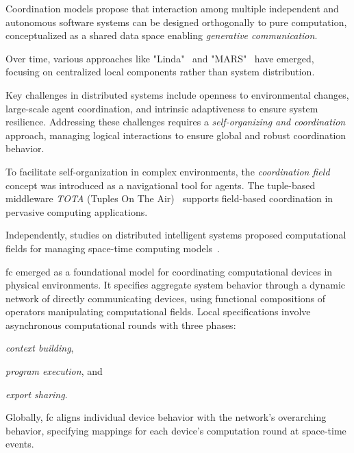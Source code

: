 \documentclass[12pt, a4paper]{article}
\newenvironment{inlinelist}{\begin{enumerate*}[label=\emph{(\roman*)}]}{\end{enumerate*}}
\begin{document}
Coordination models propose that interaction among multiple independent and autonomous software systems can be designed
orthogonally to pure computation, conceptualized as a shared data space enabling \emph{generative communication}.

Over time, various approaches like "Linda"~\cite{ViroliCoordination2012} and "MARS"~\cite{mars} have emerged,
focusing on centralized local components rather than system distribution.

Key challenges in distributed systems include openness to environmental changes, large-scale agent coordination,
and intrinsic adaptiveness to ensure system resilience.
%
Addressing these challenges requires a \emph{self-organizing and coordination} approach, managing logical interactions to
ensure global and robust coordination behavior.

To facilitate self-organization in complex environments, the \emph{coordination field} concept was introduced as a
navigational tool for agents.
%
The tuple-based middleware \textit{TOTA} (Tuples On The Air)~\cite{tota} supports field-based coordination in pervasive
computing applications.

Independently, studies on distributed intelligent systems proposed computational fields for managing space-time
computing models~\cite{JLAMP2019}.

\ac{fc} emerged as a foundational model for coordinating computational devices in physical environments.
%
It specifies aggregate system behavior through a dynamic network of directly communicating devices,
using functional compositions of operators manipulating computational fields.
%
Local specifications involve asynchronous computational rounds with three phases:
\begin{inlinelist}
    \item \emph{context building},
    \item \emph{program execution}, and
    \item \emph{export sharing}.
\end{inlinelist}

Globally,
\ac{fc} aligns individual device behavior with the network's overarching behavior,
specifying mappings for each device's computation round at space-time events.
\end{document}
